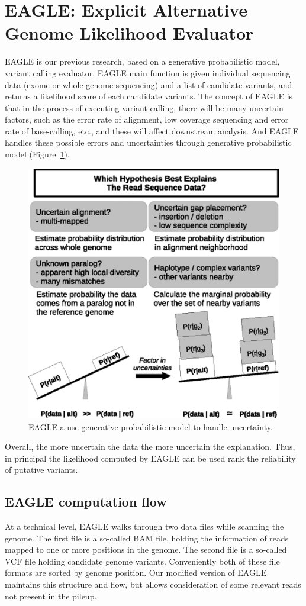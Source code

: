 \section{EAGLE: Explicit Alternative Genome Likelihood Evaluator}
EAGLE \cite{kuo2018eagle} is our previous research, based on a generative probabilistic model, variant calling evaluator, EAGLE main function is given individual sequencing data (exome or whole genome sequencing) and a list of candidate variants, and returns a likelihood score of each candidate variants.
The concept of EAGLE is that in the process of executing variant calling, there will be many uncertain factors, such as the error rate of alignment, low coverage sequencing and error rate of base-calling, etc., and these will affect downstream analysis. And EAGLE handles these possible errors and uncertainties through generative probabilistic model  (Figure~\ref{eagle_model}).
\begin{figure}[ht]
\center
\includegraphics[width=0.6\columnwidth]{body/image/eagle_model.png}
\caption[EAGLE model]{EAGLE\cite{kuo2018eagle}  a use generative probabilistic model to handle uncertainty.}
\label{eagle_model}
\end{figure}

Overall, the more uncertain the data the more uncertain the explanation.  Thus, in principal the likelihood computed by EAGLE can be used rank the reliability of putative variants.

\subsection{EAGLE computation flow}
At a technical level, EAGLE walks through two data files while scanning the genome.  The first file is a so-called BAM file, holding the information of reads mapped to one or more positions in the genome.  The second file is a so-called VCF file holding candidate genome variants.  Conveniently both of these file formats are sorted by genome position.  Our modified version of EAGLE maintains this structure and flow, but allows consideration of some relevant reads not present in the pileup.



